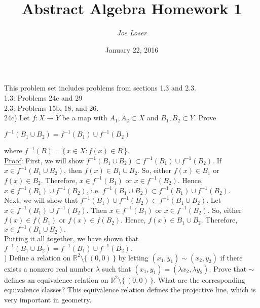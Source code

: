 \documentclass{article}
\title{Abstract Algebra Homework 1}
\author{\textit{Joe Loser}}
\date{January 22, 2016}
\begin{document}
\maketitle

\noindent This problem set includes problems from sections 1.3 and 2.3. \\
1.3: Problems 24c and 29 \\
2.3: Problems 15b, 18, and 26. \\

\noindent 24c)
Let $f: X \to Y$ be a map with $A_1, A_2 \subset X$ and $B_1, B_2 \subset Y.$ Prove
\begin{center}
$ f^{-1} (B_1 \cup B_2)  = f^{-1}(B_1) \cup f^{-1}(B_2)$
\end{center}
where $f^{-1}(B) = \{\,x \in X : f(x) \in B \,\}.$ \\

\noindent
\underline{Proof}: First, we will show $f^{-1} (B_1 \cup B_2) \subset f^{-1}(B_1) \cup f^{-1}(B_2).$ If $x \in f^{-1}(B_1 \cup B_2)$, then $f(x) \in B_1 \cup B_2.$ So, either $f(x) \in B_1$ or $f(x) \in B_2.$ Therefore, $x \in f^{-1}(B_1)$ or $x \in f^{-1}(B_2).$  Hence, $x \in f^{-1}(B_1) \cup f^{-1}(B_2)$, i.e. $f^{-1} (B_1 \cup B_2) \subset f^{-1}(B_1) \cup f^{-1}(B_2).$ \\

\noindent
Next, we will show that $f^{-1}(B_1) \cup f^{-1}(B_2) \subset f^{-1} (B_1 \cup B_2).$ Let $x \in f^{-1}(B_1) \cup f^{-1}(B_2).$ Then $x \in f^{-1}(B_1)$ or $x \in f^{-1}(B_2)$. So, either $f(x) \in f(B_1)$ or $f(x) \in f(B_2).$ Hence, $f(x) \in B_1 \cup B_2.$ Therefore, $x \in f^{-1}(B_1 \cup B_2).$ \\

\noindent
Putting it all together, we have shown that $f^{-1} (B_1 \cup B_2) = f^{-1}(B_1) \cup f^{-1}(B_2).$ \\

) Define a relation on $\mathbb{R}^{2} \setminus \{\,(0,0)\,\} $ by letting $(x_1, y_1) \sim (x_2, y_2)$ if there exists a nonzero real number $\lambda$ such that $(x_1, y_1) = (\lambda x_2, \lambda y_2).$ Prove that $\sim$ defines an equivalence relation on $\mathbb{R}^{2} \setminus \{\,(0,0)\,\}.$ What are the corresponding equivalence classes? This equivalence relation defines the projective line, which is very important in geometry. \\
\end{document}
